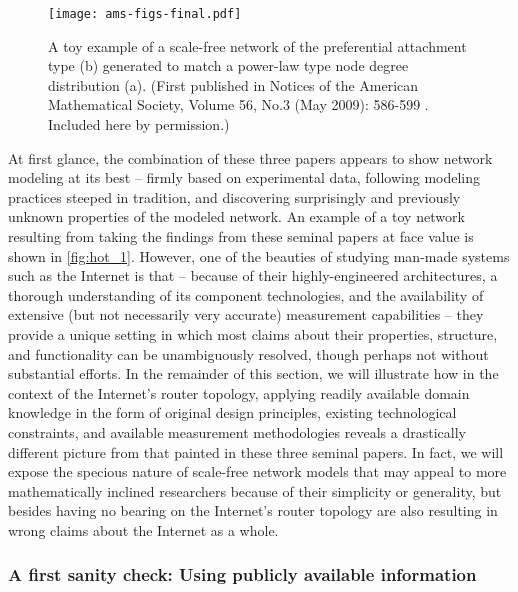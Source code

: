 \begin{figure}[!htp] 
  \begin{center}
    \texttt{[image: ams-figs-final.pdf]}
    \caption{A toy example of a scale-free network of the preferential
      attachment type (b) generated to match a power-law type node
      degree distribution (a).  (First published in Notices of the
      American Mathematical Society, Volume 56, No.3 (May 2009):
      586-599 \cite{willinger09:_mathem_and_inter}. Included here by
      permission.)
      \label{fig:hot_1}}
  \end{center}
\end{figure}         


At first glance, the combination of these three papers appears to show
network modeling at its best -- firmly based on experimental data,
following modeling practices steeped in tradition, and discovering
surprisingly and previously unknown properties of the modeled network.
An example of a toy network resulting from taking the findings from
these seminal papers at face value is shown in \autoref{fig:hot_1}.
However, one of the beauties of studying man-made systems such as the
Internet is that -- because of their highly-engineered architectures,
a thorough understanding of its component technologies, and the
availability of extensive (but not necessarily very accurate)
measurement capabilities -- they provide a unique setting in which
most claims about their properties, structure, and functionality can
be unambiguously resolved, though perhaps not without substantial
efforts. In the remainder of this section, we will illustrate how in
the context of the Internet's router topology, applying readily
available domain knowledge in the form of original design principles,
existing technological constraints, and available measurement
methodologies reveals a drastically different picture from that
painted in these three seminal papers. In fact, we will expose the
specious nature of scale-free network models that may appeal to more
mathematically inclined researchers because of their simplicity or
generality, but besides having no bearing on the Internet's router
topology are also resulting in wrong claims about the Internet as a
whole.


\subsubsection{A first sanity check: Using publicly available information}



